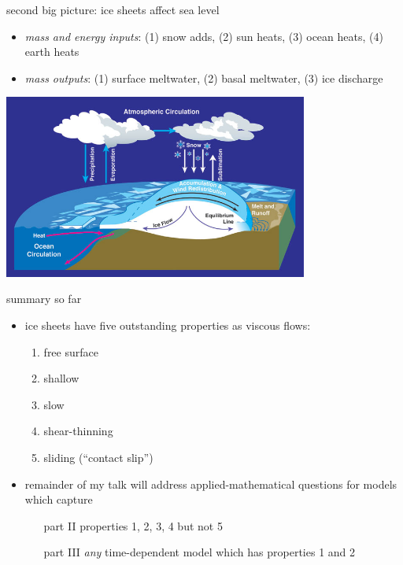 \documentclass[hide notes,intlimits]{beamer}
\begin{document}
\begin{frame}{second big picture: ice sheets affect sea level}
\medskip
\small
\begin{itemize}
\item \emph{mass and energy inputs}: (1) snow adds, (2) sun heats, (3) ocean heats, (4) earth heats
\item \emph{mass outputs}: (1) surface meltwater, (2) basal meltwater, (3) ice discharge
\end{itemize}
\begin{center}
  \includegraphics[width=0.75\textwidth]{mass-bal-atmos}
\end{center}
\end{frame}


\begin{frame}{summary so far}
\begin{itemize}
\item ice sheets have five outstanding properties as viscous flows:
  \begin{enumerate}
  \item \alert{free surface}
  \item \alert{shallow}
  \item \alert{slow}
  \item \alert{shear-thinning}
  \item \alert{sliding (``contact slip'')}
  \end{enumerate}
\item remainder of my talk will address applied-mathematical questions for models which capture
  \begin{itemize}
  \item[part II] properties 1, 2, 3, 4 but not 5
  \item[part III] \emph{any} time-dependent model which has properties 1 and 2
  \end{itemize}
\end{itemize}
\end{frame}
\end{document}
